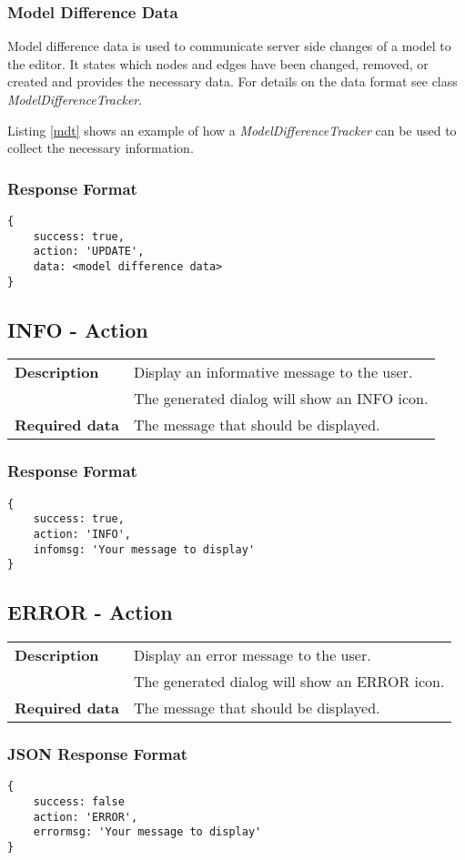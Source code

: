 	\subsubsection{Model Difference Data}
	\label{layout_data}
	Model difference data is used to communicate server side changes of a model to the editor. It states which nodes and edges have been changed, removed, or created and provides the necessary data. For details on the data format see class \textit{ModelDifferenceTracker}.
	
	Listing \ref{mdt} shows an example of how a \textit{ModelDifferenceTracker} can be used to collect the necessary information. 	
	\subsubsection{Response Format}
		\begin{lstlisting}
{
	success: true,
	action: 'UPDATE',
	data: <model difference data>
}
		\end{lstlisting}	
	
\subsection{INFO - Action}	
	\begin{table}[ht]
		\centering
		\begin{tabular}{@{}ll@{}}
			\toprule
			\textbf{Description} & Display an informative message to the user. \\
			& The generated dialog will show an INFO icon.\\
			\addlinespace
			\textbf{Required data} & The message that should be displayed.\\
			\bottomrule						
		\end{tabular}
	\end{table}
	
	\subsubsection{Response Format}
		\begin{lstlisting}
{
	success: true,
	action: 'INFO',
	infomsg: 'Your message to display'
}
		\end{lstlisting}
	
\subsection{ERROR - Action}
	\begin{table}[ht]
		\centering
		\begin{tabular}{@{}ll@{}}
			\toprule
			\textbf{Description} & Display an error message to the user. \\
			& The generated dialog will show an ERROR icon.\\
			\addlinespace
			\textbf{Required data} & The message that should be displayed.\\
			\bottomrule						
		\end{tabular}
	\end{table}
	
	\subsubsection{JSON Response Format}
		\begin{lstlisting}
{
	success: false
	action: 'ERROR',
	errormsg: 'Your message to display'
}
		\end{lstlisting}	